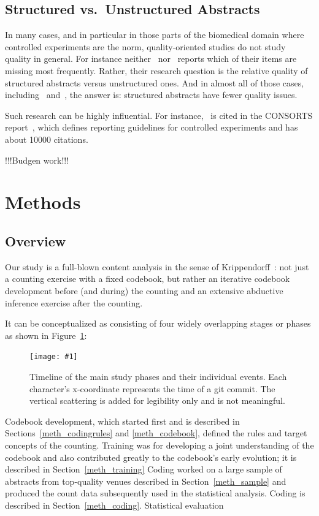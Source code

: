 \documentclass[10pt,journal,compsoc]{IEEEtran}
\newcommand{\Plot}[2]{%
	\begin{figure}[htb]%
		\centering\texttt{[image: \#1]}%
		\vspace{-4mm}\caption{#2}\label{#1}%
	\end{figure}}
\begin{document}
\subsection{Structured vs.\ Unstructured Abstracts}

In many cases, and in particular in those parts of the biomedical domain 
where controlled experiments are the norm, quality-oriented studies do not study
quality in general.
For instance neither~\cite{DupKhoLeb03} nor~\cite{ShaHar06} reports
which of their items are missing most frequently.
Rather, their research question is the relative quality of structured abstracts
versus unstructured ones. 
And in almost all of those cases, including~\cite{DupKhoLeb03} and~\cite{ShaHar06},
the answer is: structured abstracts have fewer quality issues.

Such research can be highly influential.
For instance,~\cite{HarSydBlu96} 
is cited in the CONSORTS report~\cite{MohHopSch12},
which defines reporting guidelines for controlled experiments and has about
10000 citations.

!!!Budgen work!!!


\section{Methods}


\subsection{Overview}

Our study is a full-blown content analysis in the sense of Krippendorff~\cite{Krippendorff04}:
not just a counting exercise with a fixed codebook, 
but rather an iterative codebook development before (and during) the counting
and an extensive abductive inference exercise after the counting.

It can be conceptualized as consisting of four widely overlapping stages or phases
as shown in Figure~\ref{qabstracts_timeline_commits}:
%
\Plot{qabstracts_timeline_commits}{%
	Timeline of the main study phases and their individual events.
    Each character's x-coordinate represents the time of a git commit.
    The vertical scattering is added for legibility only and is not meaningful.}
%
Codebook development, which started first and is described in Sections~\ref{meth_codingrules}
and \ref{meth_codebook},
defined the rules and target concepts of the counting.
Training was for developing a joint understanding of the codebook and also contributed
greatly to the codebook's early evolution;  
it is described in Section~\ref{meth_training}
Coding worked on a large sample of abstracts from top-quality venues described in 
Section~\ref{meth_sample} and produced the count data subsequently used in the statistical analysis.
Coding is described in Section~\ref{meth_coding}.
Statistical evaluation 
\end{document}
